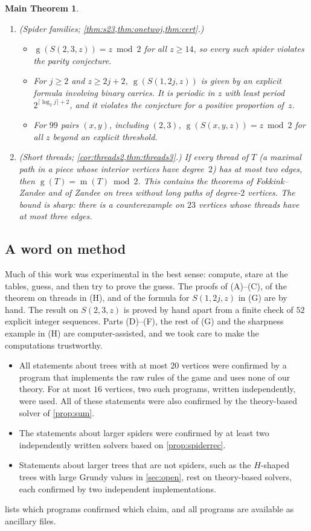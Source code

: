\documentclass[11pt]{amsart}
\newtheorem*{mainthm}{Main Theorem}
\theoremstyle{definition}
\theoremstyle{remark}
\newcommand{\gv}{\operatorname{g}}           %
\newcommand{\m}{\operatorname{m}}
\newcommand{\Sp}{S}
\begin{document}
\begin{mainthm}
\begin{enumerate}[label=\textup{(\Alph*)},leftmargin=*]
\item \textup{(Spider families; \cref{thm:s23,thm:onetwoj,thm:cert}.)}
\begin{itemize}[leftmargin=*]
\item $\gv(\Sp(2,3,z))=z\bmod 2$ for all $z\ge14$, so every such spider violates the parity conjecture.
\item For $j\ge2$ and $z\ge2j+2$, $\gv(\Sp(1,2j,z))$ is given by an explicit formula involving binary carries. It is periodic in $z$ with least period $2^{\lceil\log_2 j\rceil+2}$, and it violates the conjecture for a positive proportion of~$z$.
\item For $99$ pairs $(x,y)$, including $(2,3)$, $\gv(\Sp(x,y,z))=z\bmod 2$ for all $z$ beyond an explicit threshold.
\end{itemize}
\item \textup{(Short threads; \cref{cor:threads2,thm:threads3}.)} If every \emph{thread} of $T$ (a maximal path in a piece whose interior vertices have degree~$2$) has at most two edges, then $\gv(T)=\m(T)\bmod 2$. This contains the theorems of Fokkink--Zandee and of Zandee on trees without long paths of degree-$2$ vertices. The bound is sharp: there is a counterexample on $23$ vertices whose threads have at most three edges.
\end{enumerate}
\end{mainthm}

\subsection*{A word on method}
Much of this work was experimental in the best sense: compute, stare at the tables, guess, and then try to prove the guess. The proofs of (A)--(C), of the theorem on threads in (H), and of the formula for $\Sp(1,2j,z)$ in (G) are by hand. The result on $\Sp(2,3,z)$ is proved by hand apart from a finite check of $52$ explicit integer sequences. Parts (D)--(F), the rest of (G) and the sharpness example in (H) are computer-assisted, and we took care to make the computations trustworthy.
\begin{itemize}[leftmargin=*]
\item All statements about trees with at most $20$ vertices were confirmed by a program that implements the raw rules of the game and uses none of our theory. For at most $16$ vertices, two such programs, written independently, were used. All of these statements were also confirmed by the theory-based solver of \cref{prop:sum}.
\item The statements about larger spiders were confirmed by at least two independently written solvers based on \cref{prop:spiderrec}.
\item Statements about larger trees that are not spiders, such as the $H$-shaped trees with large Grundy values in \cref{sec:open}, rest on theory-based solvers, each confirmed by two independent implementations.
\end{itemize}
 lists which programs confirmed which claim, and all programs are available as ancillary files.
\end{document}
